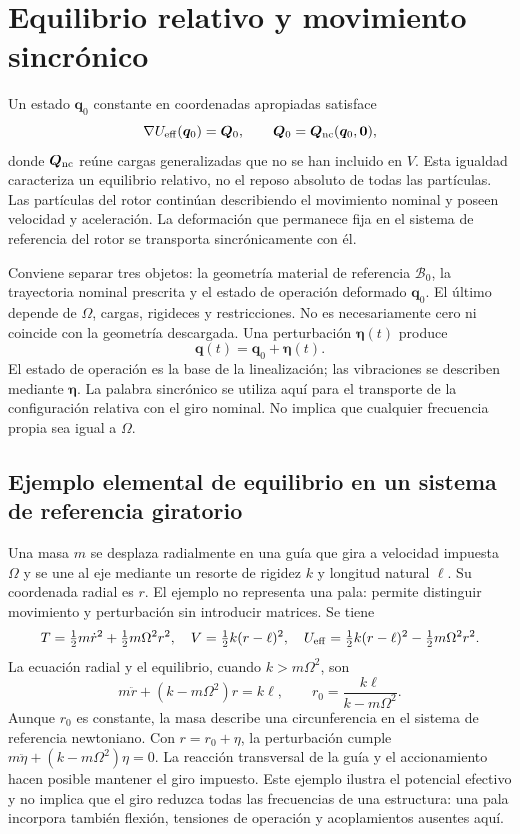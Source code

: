 \documentclass[11pt,a4paper,oneside]{report}
\newcommand{\vct}[1]{\bm{#1}}
\begin{document}
\section{Equilibrio relativo y movimiento sincrónico}
Un estado $\vct q_0$ constante en coordenadas apropiadas satisface
\begin{equation}
 \nabla U_{\rm eff}(\vct q_0)=\vct Q_0,
 \qquad \vct Q_0=\vct Q_{\rm nc}(\vct q_0,\vct0),
 \label{eq:equilibrio}
\end{equation}
donde $\vct Q_{\rm nc}$ reúne cargas generalizadas que no se han incluido en $V$. Esta igualdad caracteriza un equilibrio relativo, no el reposo absoluto de todas las partículas. Las partículas del rotor continúan describiendo el movimiento nominal y poseen velocidad y aceleración. La deformación que permanece fija en el sistema de referencia del rotor se transporta sincrónicamente con él.

Conviene separar tres objetos: la geometría material de referencia $\mathcal B_0$, la trayectoria nominal prescrita y el estado de operación deformado $\vct q_0$. El último depende de $\Omega$, cargas, rigideces y restricciones. No es necesariamente cero ni coincide con la geometría descargada. Una perturbación $\vct\eta(t)$ produce
\begin{equation}
 \vct q(t)=\vct q_0+\vct\eta(t).
\end{equation}
El estado de operación es la base de la linealización; las vibraciones se describen mediante $\vct\eta$. La palabra sincrónico se utiliza aquí para el transporte de la configuración relativa con el giro nominal. No implica que cualquier frecuencia propia sea igual a $\Omega$.

\subsection{Ejemplo elemental de equilibrio en un sistema de referencia giratorio}
Una masa $m$ se desplaza radialmente en una guía que gira a velocidad impuesta $\Omega$ y se une al eje mediante un resorte de rigidez $k$ y longitud natural $\ell$. Su coordenada radial es $r$. El ejemplo no representa una pala: permite distinguir movimiento y perturbación sin introducir matrices. Se tiene
\begin{equation}
 T=\tfrac12m\dot r^2+\tfrac12m\Omega^2r^2,
 \quad V=\tfrac12k(r-\ell)^2,
 \quad U_{\rm eff}=\tfrac12k(r-\ell)^2-\tfrac12m\Omega^2r^2.
\end{equation}
La ecuación radial y el equilibrio, cuando $k>m\Omega^2$, son
\begin{equation}
 m\ddot r+(k-m\Omega^2)r=k\ell,
 \qquad r_0=\frac{k\ell}{k-m\Omega^2}.
\end{equation}
Aunque $r_0$ es constante, la masa describe una circunferencia en el sistema de referencia newtoniano. Con $r=r_0+\eta$, la perturbación cumple $m\ddot\eta+(k-m\Omega^2)\eta=0$. La reacción transversal de la guía y el accionamiento hacen posible mantener el giro impuesto. Este ejemplo ilustra el potencial efectivo y no implica que el giro reduzca todas las frecuencias de una estructura: una pala incorpora también flexión, tensiones de operación y acoplamientos ausentes aquí.
\end{document}
